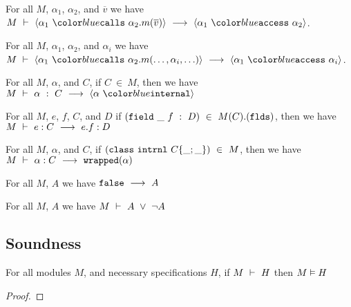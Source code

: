 \begin{lemma}
For all $M$, $\alpha_1$, $\alpha_2$, and $\overline{v}$ we have $\proves{M}{\calls{\alpha_1}{\alpha_2}{m}{\overline{v}}\ \longrightarrow\ \access{\alpha_1}{\alpha_2}}$.
\end{lemma}

\begin{lemma}
For all $M$, $\alpha_1$, $\alpha_2$, and $\alpha_i$ we have $\proves{M}{\calls{\alpha_1}{\alpha_2}{m}{\ldots, \alpha_i, \ldots}\ \longrightarrow\ \access{\alpha_1}{\alpha_i}}$.
\end{lemma}

\begin{lemma}
For all $M$, $\alpha$, and $C$, if $C\ \in\ M$, then we have $\proves{M}{\alpha\ :\ C\ \longrightarrow\ \internal{\alpha}}$
\end{lemma}

\begin{lemma}
For all $M$, $e$, $f$, $C$, and $D$ if $(\prg{field}\ \_\ f\ :\ D)\ \in\ M(C).(\prg{flds})$, then we have $M\ \vdash\ e : C\ \longrightarrow\ e.f : D$
\end{lemma}

\begin{lemma}
For all $M$, $\alpha$, and $C$, if $(\prg{class}\ \prg{intrnl}\ C \{\_; \_\})\ \in\ M$, then we have $\proves{M}{\alpha : C\ \longrightarrow\ \wrapped{\alpha}}$
\end{lemma}

\begin{lemma}
For all $M$, $A$ we have $\false\ \longrightarrow\ A$
\end{lemma}
\begin{lemma}
For all $M$, $A$ we have $M\ \vdash\ A\ \vee\ \neg A$
\end{lemma}





\subsection{Soundness}
\begin{theorem}[Soundness]
For all modules $M$, and necessary specifications $H$, if
$M\ \vdash\ H$ then $M \vDash H$
\end{theorem}
\begin{proof}
\end{proof}
